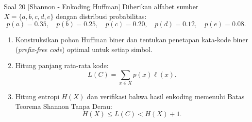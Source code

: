 \documentclass[11pt,a4paper]{article}
\begin{document}
\begin{soalshannon}{Soal 20 [Shannon - Enkoding Huffman]}
Diberikan alfabet sumber $X = \{a, b, c, d, e\}$ dengan distribusi probabilitas:
\[
p(a) = 0.35, \quad p(b) = 0.25, \quad p(c) = 0.20, \quad p(d) = 0.12, \quad p(e) = 0.08.
\]
\begin{enumerate}[label=(\alph*)]
    \item Konstruksikan pohon Huffman biner dan tentukan penetapan kata-kode biner (\textit{prefix-free code}) optimal untuk setiap simbol.
    \item Hitung panjang rata-rata kode:
    \[
    L(C) = \sum_{x \in X} p(x) \ell(x).
    \]
    \item Hitung entropi $H(X)$ dan verifikasi bahwa hasil enkoding memenuhi Batas Teorema Shannon Tanpa Derau:
    \[
    H(X) \le L(C) < H(X) + 1.
    \]
\end{enumerate}
\end{soalshannon}
\end{document}
